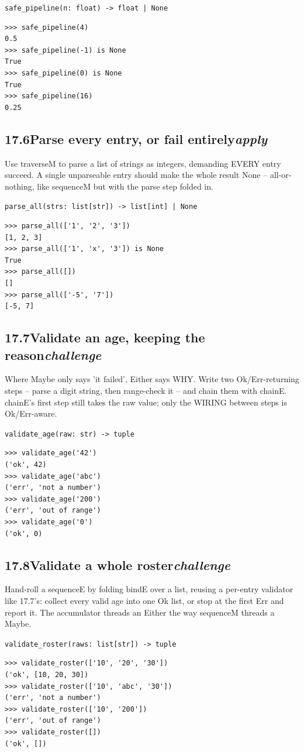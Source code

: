 \documentclass[10pt,letterpaper]{book}
\begin{document}
\noindent\texttt{safe\_pipeline(n: float) -> float | None}
\begin{lstlisting}[style=ex]
>>> safe_pipeline(4)
0.5
>>> safe_pipeline(-1) is None
True
>>> safe_pipeline(0) is None
True
>>> safe_pipeline(16)
0.25
\end{lstlisting}
\subsection*{17.6\quad Parse every entry, or fail entirely\hfill\textnormal{\textit{apply}}}
Use traverseM to parse a list of strings as integers, demanding EVERY entry succeed. A single unparseable entry should make the whole result None -- all-or-nothing, like sequenceM but with the parse step folded in.

\noindent\texttt{parse\_all(strs: list[str]) -> list[int] | None}
\begin{lstlisting}[style=ex]
>>> parse_all(['1', '2', '3'])
[1, 2, 3]
>>> parse_all(['1', 'x', '3']) is None
True
>>> parse_all([])
[]
>>> parse_all(['-5', '7'])
[-5, 7]
\end{lstlisting}
\subsection*{17.7\quad Validate an age, keeping the reason\hfill\textnormal{\textit{challenge}}}
Where Maybe only says 'it failed', Either says WHY. Write two Ok/Err-returning steps -- parse a digit string, then range-check it -- and chain them with chainE. chainE's first step still takes the raw value; only the WIRING between steps is Ok/Err-aware.

\noindent\texttt{validate\_age(raw: str) -> tuple}
\begin{lstlisting}[style=ex]
>>> validate_age('42')
('ok', 42)
>>> validate_age('abc')
('err', 'not a number')
>>> validate_age('200')
('err', 'out of range')
>>> validate_age('0')
('ok', 0)
\end{lstlisting}
\subsection*{17.8\quad Validate a whole roster\hfill\textnormal{\textit{challenge}}}
Hand-roll a sequenceE by folding bindE over a list, reusing a per-entry validator like 17.7's: collect every valid age into one Ok list, or stop at the first Err and report it. The accumulator threads an Either the way sequenceM threads a Maybe.

\noindent\texttt{validate\_roster(raws: list[str]) -> tuple}
\begin{lstlisting}[style=ex]
>>> validate_roster(['10', '20', '30'])
('ok', [10, 20, 30])
>>> validate_roster(['10', 'abc', '30'])
('err', 'not a number')
>>> validate_roster(['10', '200'])
('err', 'out of range')
>>> validate_roster([])
('ok', [])
\end{lstlisting}
\clearpage
\end{document}
